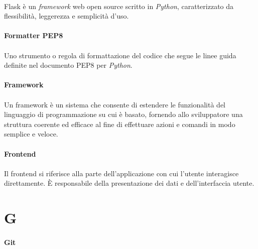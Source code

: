 \documentclass[10pt, a4paper]{article}
\begin{document}
\paragraph{}Flask è un \textit{framework\pg} web open source scritto in \textit{Python\pg}, caratterizzato da flessibilità, leggerezza e semplicità d’uso.

\vspace{2em}
\paragraph{Formatter PEP8}\noindent\hrulefill
\paragraph{}Uno strumento o regola di formattazione del codice che segue le linee guida definite nel documento PEP8 per \textit{Python\pg}.


\vspace{2em}
\paragraph{Framework}\noindent\hrulefill
\paragraph{}Un framework è un sistema che consente di estendere le funzionalità del linguaggio di programmazione su cui è basato, fornendo allo sviluppatore una struttura coerente ed efficace al fine di effettuare azioni e comandi in modo semplice e veloce.

\vspace{2em}
\paragraph{Frontend}\noindent\hrulefill
\paragraph{}Il frontend si riferisce alla parte dell'applicazione con cui l'utente interagisce direttamente. È responsabile della presentazione dei dati e dell'interfaccia utente.

\newpage
\section{G}
\vspace{2em}
\paragraph{Git}\noindent\hrulefill
\end{document}
